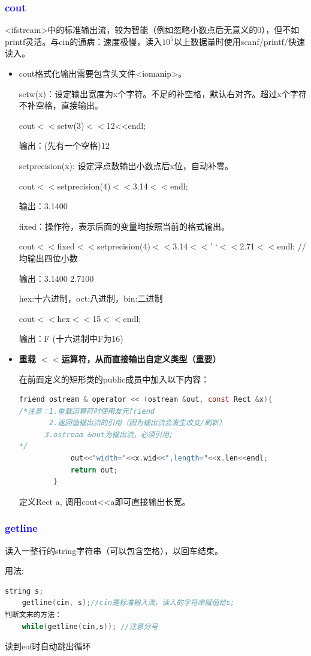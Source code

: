 \documentclass[UTF8]{ctexart}
\begin{document}
\subsubsection{\textcolor{blue}{cout}}
<ifstream>中的标准输出流，较为智能（例如忽略小数点后无意义的0），但不如printf灵活。与cin的通病：速度极慢，读入$10^5$以上数据量时使用scanf/printf/快速读入。
\begin{itemize}
    \item cout格式化输出需要包含头文件<iomanip>。

setw(x)：设定输出宽度为x个字符。不足的补空格，默认右对齐。超过x个字符不补空格，直接输出。

cout$<<$setw(3)$<<$12<<endl;

输出：(先有一个空格)12

setprecision(x): 设定浮点数输出小数点后x位，自动补零。

cout$<<$setprecision(4)$<<$3.14$<<$endl;

输出：3.1400

fixed：操作符，表示后面的变量均按照当前的格式输出。

cout$<<$fixed$<<$setprecision(4)$<<$3.14$<<$’ ‘$<<$2.71$<<$endl; //均输出四位小数

输出：3.1400 2.7100

hex:十六进制，oct:八进制，bin:二进制

cout$<<$hex$<<$15$<<$endl;

输出：F (十六进制中F为16)

\item \textbf{重载
$<<$运算符，从而直接输出自定义类型（重要）}

在前面定义的矩形类的public成员中加入以下内容：
\begin{lstlisting}[language = C,basicstyle=\small\ttfamily]
friend ostream & operator << (ostream &out, const Rect &x){
/*注意：1.重载运算符时使用友元friend 
       2.返回值输出流的引用（因为输出流会发生改变/刷新）
	  3.ostream &out为输出流，必须引用; 
*/
			out<<"width="<<x.wid<<",length="<<x.len<<endl;
			return out; 
		}
\end{lstlisting}
定义Rect a, 调用cout<<a即可直接输出长宽。
\end{itemize}
\subsubsection{\textcolor{blue}{getline}}
读入一整行的string字符串（可以包含空格），以回车结束。

用法:
   \begin{lstlisting}[language = C,basicstyle=\small\ttfamily] 
    string s;
    getline(cin, s);//cin是标准输入流，读入的字符串赋值给s;
判断文末的方法：
	while(getline(cin,s)); //注意分号
    \end{lstlisting}
	读到eof时自动跳出循环
\end{document}
